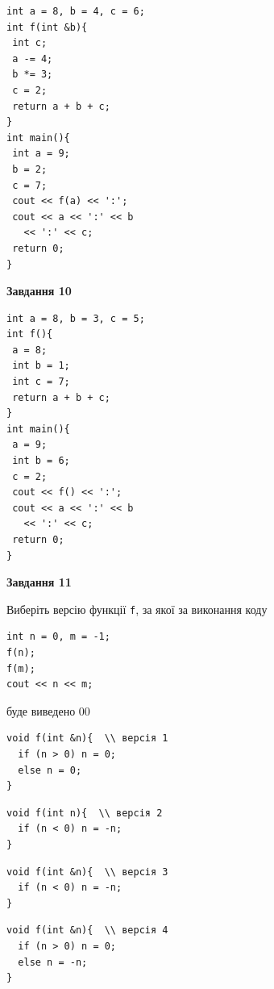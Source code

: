 \documentclass[12pt, ukrainian]{article}
\def\code#1{\Verb!#1!}
\begin{document}
{\begin {large}
\begin{minipage}[t]{7.0cm}
\begin{verbatim}
int a = 8, b = 4, c = 6;
int f(int &b){
 int c;
 a -= 4;
 b *= 3;
 c = 2;
 return a + b + c;
}
int main(){
 int a = 9;
 b = 2;
 c = 7;
 cout << f(a) << ':';
 cout << a << ':' << b 
   << ':' << c;
 return 0;
}
\end{verbatim}



\begin{center}
\textbf{Завдання 10}
\end{center}
\vspace{-8mm}

\begin{verbatim}
int a = 8, b = 3, c = 5;
int f(){
 a = 8;
 int b = 1;
 int c = 7;
 return a + b + c;
}
int main(){
 a = 9;
 int b = 6;
 c = 2;
 cout << f() << ':';
 cout << a << ':' << b 
   << ':' << c;
 return 0;
}
\end{verbatim}

\end{minipage}
\vline \hspace{1mm}
\begin{minipage}[t]{11.0cm}

\begin{center}
\textbf{Завдання 11}
\end{center}
Виберіть версію функції \code{f}, за якої за виконання коду
\begin{verbatim}
int n = 0, m = -1;
f(n);
f(m);
cout << n << m;
\end{verbatim}

буде виведено 00

\begin{verbatim}
void f(int &n){  \\ версія 1
  if (n > 0) n = 0;
  else n = 0;
}
\end{verbatim}

\vspace{-8mm}\begin{verbatim}
void f(int n){  \\ версія 2
  if (n < 0) n = -n;
}
\end{verbatim}

\vspace{-8mm}\begin{verbatim}
void f(int &n){  \\ версія 3
  if (n < 0) n = -n;
}
\end{verbatim}

\vspace{-8mm}\begin{verbatim}
void f(int &n){  \\ версія 4
  if (n > 0) n = 0;
  else n = -n;
}
\end{verbatim}




\end{minipage}
\end{large}}
\end{document}
